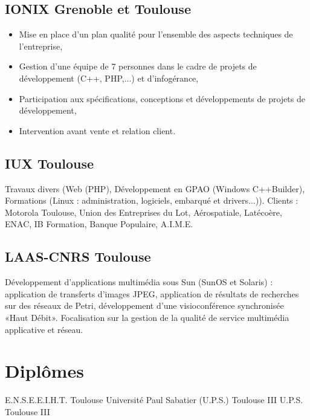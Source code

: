 \documentclass[10pt,a4paper]{moderncv}
\begin{document}
\subsection{IONIX Grenoble et Toulouse}
          { \begin{itemize}
              \item Mise en place d'un plan qualité pour l'ensemble des aspects techniques de l'entreprise,
              \item Gestion d'une équipe de 7 personnes dans le cadre de projets de développement (C++, PHP,...) et d'infogérance,
              \item Participation aux spécifications, conceptions et développements de projets de développement,
              \item Intervention avant vente et relation client. 
            \end{itemize}
          }
\subsection{IUX Toulouse}
          {Travaux divers (Web (PHP), Développement en GPAO (Windows C++Builder), Formations (Linux : administration, logiciels, embarqué et drivers...)).
Clients : Motorola Toulouse, Union des Entreprises du Lot, Aérospatiale, Latécoère, ENAC, IB Formation, Banque Populaire, A.I.M.E.}          
\subsection{LAAS-CNRS Toulouse}
          {Développement d'applications multimédia sous Sun (SunOS et Solaris) : application de transferts d'images JPEG, application de résultats de recherches sur des réseaux de Petri, développement d'une visioconférence synchronisée «Haut Débit». Focalisation sur la gestion de la qualité de service multimédia applicative et réseau.}

\section{Diplômes}
          {E.N.S.E.E.I.H.T.}
          {Toulouse}{}{}        
          {Université Paul Sabatier (U.P.S.) Toulouse III}{}{}{}        
          {U.P.S. Toulouse III}{}{}
          {
          }
\end{document}
